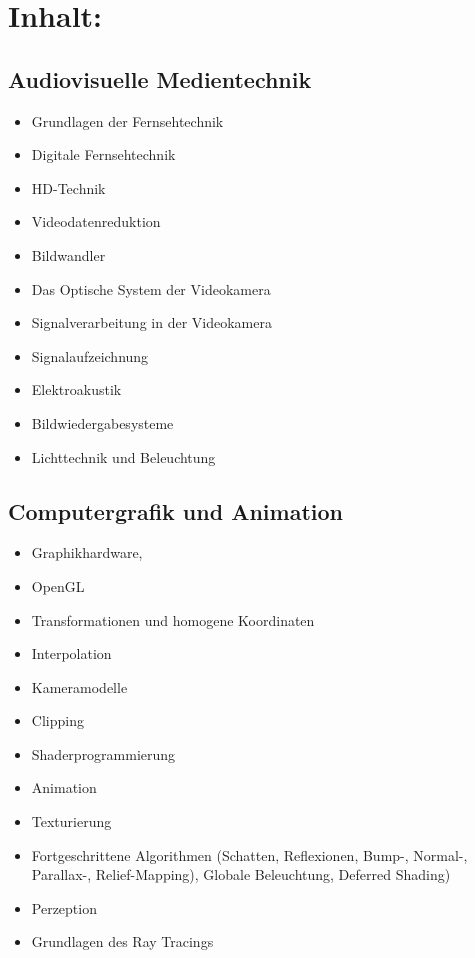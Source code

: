 \section{Inhalt:}\label{inhalt-29}

\subsection{Audiovisuelle
Medientechnik}\label{audiovisuelle-medientechnik-1}

\begin{itemize}
\tightlist
\item
  Grundlagen der Fernsehtechnik
\item
  Digitale Fernsehtechnik
\item
  HD-Technik
\item
  Videodatenreduktion
\item
  Bildwandler
\item
  Das Optische System der Videokamera
\item
  Signalverarbeitung in der Videokamera
\item
  Signalaufzeichnung
\item
  Elektroakustik
\item
  Bildwiedergabesysteme
\item
  Lichttechnik und Beleuchtung
\end{itemize}

\subsection{Computergrafik und
Animation}\label{computergrafik-und-animation-1}

\begin{itemize}
\tightlist
\item
  Graphikhardware,
\item
  OpenGL
\item
  Transformationen und homogene Koordinaten
\item
  Interpolation
\item
  Kameramodelle
\item
  Clipping
\item
  Shaderprogrammierung
\item
  Animation
\item
  Texturierung
\item
  Fortgeschrittene Algorithmen (Schatten, Reflexionen, Bump-, Normal-,
  Parallax-, Relief-Mapping), Globale Beleuchtung, Deferred Shading)
\item
  Perzeption
\item
  Grundlagen des Ray Tracings
\end{itemize}

